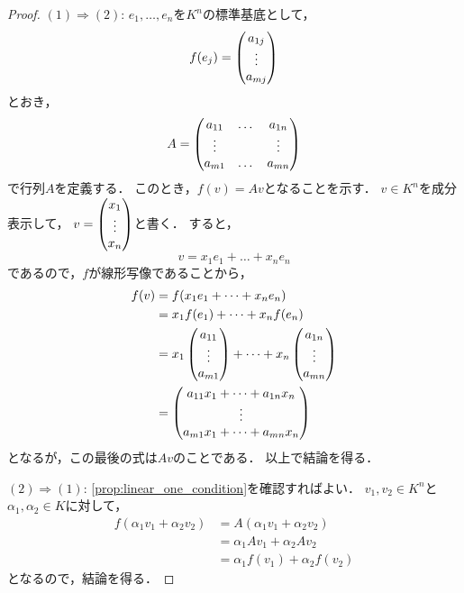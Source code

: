 \begin{proof}
    $(1) \Rightarrow (2)$:
    $e_1,\dots,e_n$を$K^n$の標準基底として，
    \[
        f(e_j) = \begin{pmatrix} a_{1j} \\ \vdots \\ a_{mj} \end{pmatrix} 
    \]
    とおき，
    \[
        A = \begin{pmatrix}  a_{11} & \dots & a_{1n} \\ \vdots & & \vdots \\ a_{m1} & \dots & a_{mn}  \end{pmatrix}
    \]
    で行列$A$を定義する．
    このとき，$f(v) = Av$となることを示す．
    $v \in K^n$を成分表示して，
    $v = \begin{pmatrix} x_1 \\ \vdots \\ x_n \end{pmatrix}$と書く．
    すると，
    \[
        v = x_1 e_1 + \dots + x_n e_n
    \]
    であるので，$f$が線形写像であることから，
    \[
        \begin{aligned}
            f(v) &= f(x_1 e_1 + \dots + x_n e_n) \\
            &= x_1 f(e_1) + \dots + x_n f(e_n) \\
            &= x_1  \begin{pmatrix} a_{11} \\ \vdots \\ a_{m1} \end{pmatrix} + \dots + x_n  \begin{pmatrix} a_{1n} \\ \vdots \\ a_{mn} \end{pmatrix}  \\
            &= \begin{pmatrix} a_{11}x_1 + \dots + a_{1n}x_n \\ \vdots \\ a_{m1}x_1 + \dots + a_{mn}x_n  \end{pmatrix}
        \end{aligned}
    \]
    となるが，この最後の式は$Av$のことである．
    以上で結論を得る．
    
    $(2) \Rightarrow (1)$: 
    \cref{prop:linear_one_condition}を確認すればよい．
    $v_1,v_2 \in K^n$と$\alpha_1,\alpha_2 \in K$に対して，
    \[
        \begin{aligned}
            f(\alpha_1 v_1 + \alpha_2 v_2) &= A(\alpha_1 v_1 + \alpha_2 v_2) \\
            &= \alpha_1 A v_1 + \alpha_2 A v_2 \\
            &= \alpha_1 f(v_1) + \alpha_2 f(v_2)
        \end{aligned}
    \]
    となるので，結論を得る．
\end{proof}
